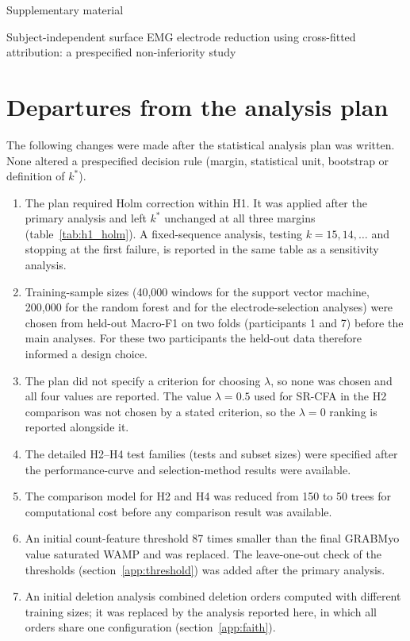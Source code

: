 \documentclass{iopjournal}
\begin{document}
{\noindent\fontsize{16}{19}\selectfont\sffamily Supplementary material\par}
\vspace{2mm}
{\noindent\large Subject-independent surface EMG electrode reduction using cross-fitted attribution: a prespecified non-inferiority study\par}
\vspace{6mm}

\section{Departures from the analysis plan}
\label{app:deviations}
The following changes were made after the statistical analysis plan was written. None altered a prespecified decision rule (margin, statistical unit, bootstrap or definition of $k^*$).
\begin{enumerate}
\item The plan required Holm correction within H1. It was applied after the primary analysis and left $k^*$ unchanged at all three margins (table~\ref{tab:h1_holm}). A fixed-sequence analysis, testing $k = 15, 14, \ldots$ and stopping at the first failure, is reported in the same table as a sensitivity analysis.
\item Training-sample sizes (40,000 windows for the support vector machine, 200,000 for the random forest and for the electrode-selection analyses) were chosen from held-out Macro-F1 on two folds (participants 1 and 7) before the main analyses. For these two participants the held-out data therefore informed a design choice.
\item The plan did not specify a criterion for choosing $\lambda$, so none was chosen and all four values are reported. The value $\lambda = 0.5$ used for SR-CFA in the H2 comparison was not chosen by a stated criterion, so the $\lambda = 0$ ranking is reported alongside it.
\item The detailed H2--H4 test families (tests and subset sizes) were specified after the performance-curve and selection-method results were available.
\item The comparison model for H2 and H4 was reduced from 150 to 50 trees for computational cost before any comparison result was available.
\item An initial count-feature threshold 87 times smaller than the final GRABMyo value saturated WAMP and was replaced. The leave-one-out check of the thresholds (section~\ref{app:threshold}) was added after the primary analysis.
\item An initial deletion analysis combined deletion orders computed with different training sizes; it was replaced by the analysis reported here, in which all orders share one configuration (section~\ref{app:faith}).

\end{enumerate}
\end{document}

